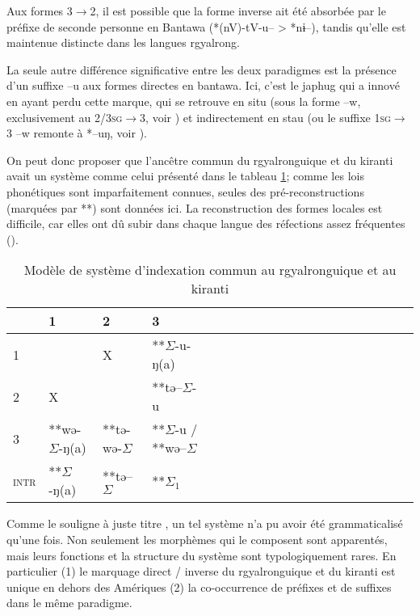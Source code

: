\documentclass[oldfontcommands,oneside,a4paper,11pt]{article}
\newcommand{\ipa}[1]{{\phon \mbox{#1}}} %
\newcommand{\grise}[1]{\cellcolor{lightgray}\textbf{#1}}
\newcommand{\ra}{$\Sigma_1$}
\newcommand{\ro}{$\Sigma$}
\begin{document}
Aux formes \textsc{3$\rightarrow$2}, il est possible que la forme inverse ait été absorbée par le préfixe de seconde personne en Bantawa (*\ipa{(nV)-tV-u--}  > *\ipa{nɨ--}), tandis qu'elle est maintenue distincte dans les langues rgyalrong. 

La seule autre différence significative entre les deux paradigmes est la présence d'un suffixe \ipa{--u} aux formes directes en bantawa. Ici, c'est le japhug qui a innové en ayant perdu cette marque, qui se retrouve en situ (sous la forme \ipa{--w}, exclusivement au \textsc{2/3sg$\rightarrow$3}, voir \citealt{linyj03tense}) et indirectement en stau (ou le suffixe \textsc{1sg$\rightarrow$3} \ipa{--w} remonte à *\ipa{--uŋ}, voir \citealt{jacques14rtau}).

On peut donc proposer que l'ancêtre commun du rgyalronguique et du kiranti avait un système comme celui présenté dans le tableau \ref{tab:commun};  comme les lois phonétiques sont imparfaitement connues, seules des pré-reconstructions (marquées par **) sont données ici. La reconstruction des formes locales est difficile, car elles ont dû subir dans chaque langue des réfections assez fréquentes (\citealt{heath98skewing}).

 

\begin{table}[H]
\caption{Modèle de système d'indexation commun au rgyalronguique et au kiranti} \centering \label{tab:commun}
\begin{tabular}{l|lllllllllllllllllll}
\toprule
&1 & 2 &3 &\\
\midrule
1 &\grise{}& X& **\ro{}-\ipa{u-ŋ(a)}	 \\
2 &X &\grise{} & **\ipa{tə--}\ro{}-\ipa{u}\\
3 &**\ipa{wə-}\ro{}-\ipa{ŋ(a)}&**\ipa{tə-wə-}\ro{}& **\ro{}-\ipa{u} / **\ipa{wə}--\ro{} \\
\midrule
\textsc{intr} & **\ro{}-\ipa{ŋ(a)}&**\ipa{tə--}\ro{}&**\ra{} \\
\bottomrule
\end{tabular}
\end{table}
 
 Comme le souligne à juste titre \citet{delancey14second}, un tel système n'a pu avoir été grammaticalisé qu'une fois. Non seulement les morphèmes qui le composent sont apparentés, mais leurs fonctions et la structure du système sont typologiquement  rares. En particulier (1) le marquage direct / inverse du rgyalronguique et du kiranti est unique en dehors des Amériques (2) la co-occurrence de préfixes et de suffixes dans le même paradigme.
 
\end{document}
